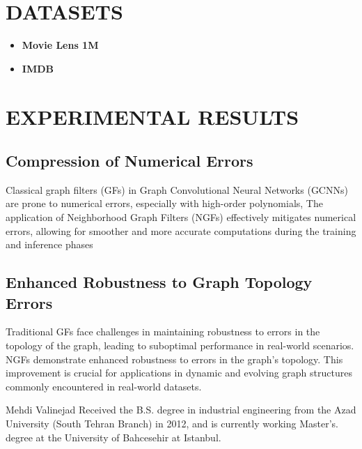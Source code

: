 \documentclass[journal]{IEEEtran}
\begin{document}

\section{DATASETS}

\begin{itemize}
  \item \textbf{Movie Lens 1M}
  \item \textbf{IMDB}
\end{itemize}



\section{EXPERIMENTAL RESULTS}

\subsection*{Compression of Numerical Errors}

Classical graph filters (GFs) in Graph Convolutional Neural Networks (GCNNs) are prone to numerical errors, especially with high-order polynomials,
The application of Neighborhood Graph Filters (NGFs) effectively mitigates numerical errors, allowing for smoother and more accurate computations during the training and inference phases

\subsection*{Enhanced Robustness to Graph Topology Errors}

Traditional GFs face challenges in maintaining robustness to errors in the topology of the graph, leading to suboptimal performance in real-world scenarios.
NGFs demonstrate enhanced robustness to errors in the graph's topology. This improvement is crucial for applications in dynamic and evolving graph structures commonly encountered in real-world datasets.

\ifCLASSOPTIONcaptionsoff
  \newpage
\fi






\begin{IEEEbiographynophoto}{Mehdi Valinejad}
Received the B.S. degree in industrial engineering from the Azad University (South Tehran Branch) in 2012, and is currently working Master's. degree at the University of Bahcesehir at Istanbul.
\end{IEEEbiographynophoto}
\end{document}
